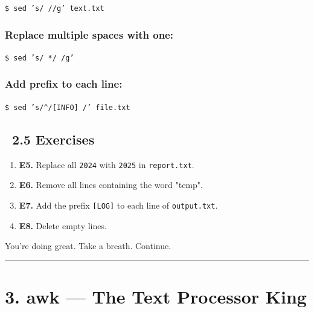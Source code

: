 \documentclass[12pt]{article}
\newcommand{\exerciseicon}{\faTasks}
\begin{document}
\begin{highlightbox}
\texttt{\$ sed 's/ //g' text.txt}
\end{highlightbox}

\subsubsection*{Replace multiple spaces with one:}

\begin{highlightbox}
\texttt{\$ sed 's/  */ /g'}
\end{highlightbox}

\subsubsection*{Add prefix to each line:}

\begin{highlightbox}
\texttt{\$ sed 's/\^{}/[INFO] /' file.txt}
\end{highlightbox}

\subsection*{\exerciseicon\ 2.5 Exercises}

\begin{enumerate}
    \item \textbf{E5.} Replace all \texttt{2024} with \texttt{2025} in \texttt{report.txt}.
    
    \item \textbf{E6.} Remove all lines containing the word "temp".
    
    \item \textbf{E7.} Add the prefix \texttt{[LOG]} to each line of \texttt{output.txt}.
    
    \item \textbf{E8.} Delete empty lines.
\end{enumerate}

\begin{infobox}
You're doing great. Take a breath. Continue.
\end{infobox}

\vspace{1em}
\begin{center}
\color{teamred}\rule{0.8\textwidth}{1pt}
\end{center}

\section*{3. awk — The Text Processor King}
\end{document}
